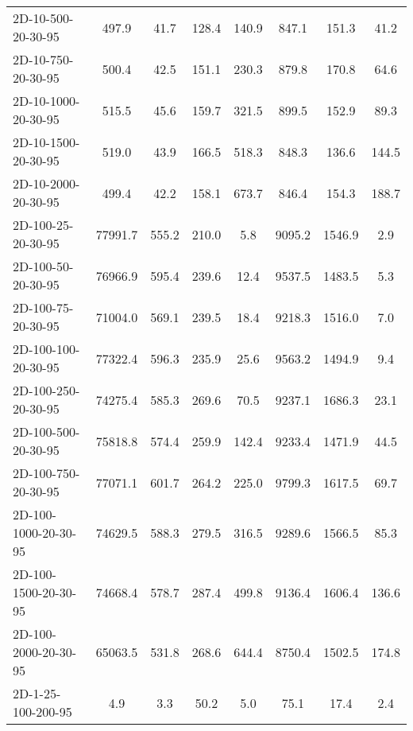 \documentclass{article}
\begin{document}
\begin{table}[h]
\begin{center}
\begin{tabular}{|l||c|c|c|c|c|c|c|}
            2D-10-500-20-30-95            & 497.9   & 41.7      & 128.4      & 140.9       & 847.1    & 151.3     & 41.2       \\
            2D-10-750-20-30-95            & 500.4   & 42.5      & 151.1      & 230.3       & 879.8    & 170.8     & 64.6       \\
            2D-10-1000-20-30-95           & 515.5   & 45.6      & 159.7      & 321.5       & 899.5    & 152.9     & 89.3       \\
            2D-10-1500-20-30-95           & 519.0   & 43.9      & 166.5      & 518.3       & 848.3    & 136.6     & 144.5      \\
            2D-10-2000-20-30-95           & 499.4   & 42.2      & 158.1      & 673.7       & 846.4    & 154.3     & 188.7      \\
            \hline
            2D-100-25-20-30-95            & 77991.7 & 555.2     & 210.0      & 5.8         & 9095.2   & 1546.9    & 2.9        \\
            2D-100-50-20-30-95            & 76966.9 & 595.4     & 239.6      & 12.4        & 9537.5   & 1483.5    & 5.3        \\
            2D-100-75-20-30-95            & 71004.0 & 569.1     & 239.5      & 18.4        & 9218.3   & 1516.0    & 7.0        \\
            2D-100-100-20-30-95           & 77322.4 & 596.3     & 235.9      & 25.6        & 9563.2   & 1494.9    & 9.4        \\
            2D-100-250-20-30-95           & 74275.4 & 585.3     & 269.6      & 70.5        & 9237.1   & 1686.3    & 23.1       \\
            2D-100-500-20-30-95           & 75818.8 & 574.4     & 259.9      & 142.4       & 9233.4   & 1471.9    & 44.5       \\
            2D-100-750-20-30-95           & 77071.1 & 601.7     & 264.2      & 225.0       & 9799.3   & 1617.5    & 69.7       \\
            2D-100-1000-20-30-95          & 74629.5 & 588.3     & 279.5      & 316.5       & 9289.6   & 1566.5    & 85.3       \\
            2D-100-1500-20-30-95          & 74668.4 & 578.7     & 287.4      & 499.8       & 9136.4   & 1606.4    & 136.6      \\
            2D-100-2000-20-30-95          & 65063.5 & 531.8     & 268.6      & 644.4       & 8750.4   & 1502.5    & 174.8      \\
            \hline
            2D-1-25-100-200-95            & 4.9     & 3.3       & 50.2       & 5.0         & 75.1     & 17.4      & 2.4        \\

\end{tabular}
\end{center}
\end{table}
\end{document}
